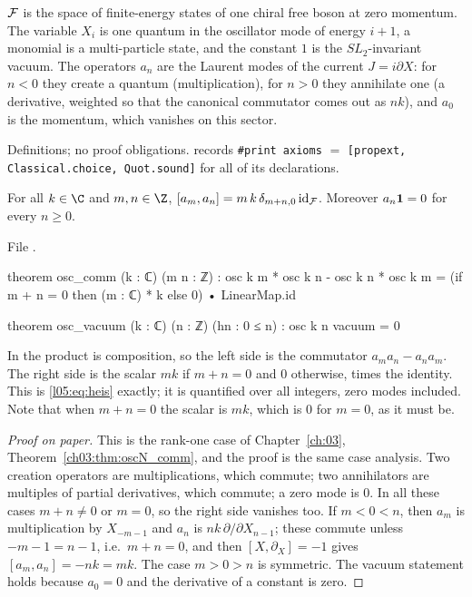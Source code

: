 \begin{physics}
$\mathcal{F}$ is the space of finite-energy states of one chiral free boson at zero momentum. The variable
$X_i$ is one quantum in the oscillator mode of energy $i+1$, a monomial is a multi-particle state, and the
constant $1$ is the $SL_2$-invariant vacuum. The operators $a_n$ are the Laurent modes of the current
$J=i\partial X$: for $n<0$ they create a quantum (multiplication), for $n>0$ they annihilate one (a
derivative, weighted so that the canonical commutator comes out as $nk$), and $a_0$ is the momentum, which
vanishes on this sector.
\end{physics}

\begin{status}
Definitions; no proof obligations.  records
\texttt{\#print axioms} $=$ \texttt{[propext, Classical.choice, Quot.sound]} for all of its declarations.
\end{status}

\begin{theorem}\label{l05:thm:osccomm}
For all $k\in\C$ and $m,n\in\Z$, $[a_m,a_n]=m\,k\,\delta_{m+n,0}\,\mathrm{id}_{\mathcal{F}}$. Moreover
$a_n\mathbf{1}=0$ for every $n\ge0$.
\end{theorem}

\noindent File .
\begin{leancode}
theorem osc_comm (k : ℂ) (m n : ℤ) :
    osc k m * osc k n - osc k n * osc k m
      = (if m + n = 0 then (m : ℂ) * k else 0) • LinearMap.id

theorem osc_vacuum (k : ℂ) (n : ℤ) (hn : 0 ≤ n) : osc k n vacuum = 0
\end{leancode}

\begin{dictionary}
In  the product \lean{*} is composition, so the left side is the commutator
$a_ma_n-a_na_m$. The right side is the scalar $mk$ if $m+n=0$ and $0$ otherwise, times the identity. This
is \eqref{l05:eq:heis} exactly; it is quantified over all integers, zero modes included. Note that when
$m+n=0$ the scalar is $mk$, which is $0$ for $m=0$, as it must be.
\end{dictionary}

\begin{proof}[Proof on paper]
This is the rank-one case of Chapter~\ref{ch:03}, Theorem~\ref{ch03:thm:oscN_comm}, and the proof is the same
case analysis. Two creation operators are multiplications, which commute; two annihilators are
multiples of partial derivatives, which commute; a zero mode is $0$. In all these cases $m+n\ne0$ or
$m=0$, so the right side vanishes too. If $m<0<n$, then $a_m$ is multiplication by $X_{-m-1}$ and $a_n$ is
$nk\,\partial/\partial X_{n-1}$; these commute unless $-m-1=n-1$, i.e.\ $m+n=0$, and then
$[X,\partial_X]=-1$ gives $[a_m,a_n]=-nk=mk$. The case $m>0>n$ is symmetric. The vacuum statement holds
because $a_0=0$ and the derivative of a constant is zero.
\end{proof}

